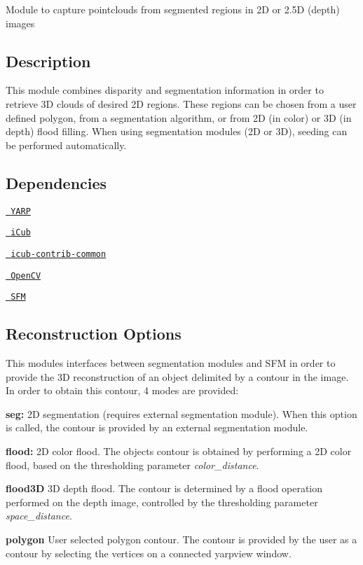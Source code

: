 Module to capture pointclouds from segmented regions in 2D or 2.\+5D (depth) images

\subsection*{Description}

This module combines disparity and segmentation information in order to retrieve 3D clouds of desired 2D regions. These regions can be chosen from a user defined polygon, from a segmentation algorithm, or from 2D (in color) or 3D (in depth) flood filling. When using segmentation modules (2D or 3D), seeding can be performed automatically.

\subsection*{Dependencies}


\begin{DoxyItemize}
\item \href{https://github.com/robotology/yarp}{\texttt{ Y\+A\+RP}}
\item \href{https://github.com/robotology/icub-main}{\texttt{ i\+Cub}}
\item \href{https://github.com/robotology/icub-contrib-common}{\texttt{ icub-\/contrib-\/common}}
\item \href{http://opencv.org/}{\texttt{ Open\+CV}}
\item \href{https://github.com/robotology/stereo-vision}{\texttt{ S\+FM}}
\end{DoxyItemize}

\subsection*{Reconstruction Options}

This modules interfaces between segmentation modules and S\+FM in order to provide the 3D reconstruction of an object delimited by a contour in the image. In order to obtain this contour, 4 modes are provided\+:


\begin{DoxyItemize}
\item {\bfseries{seg\+:}} 2D segmentation (requires external segmentation module). When this option is called, the contour is provided by an external segmentation module.
\item {\bfseries{flood\+:}} 2D color flood. The object\textquotesingle{}s contour is obtained by performing a 2D color flood, based on the thresholding parameter {\itshape color\+\_\+distance}.
\item {\bfseries{flood3D}} 3D depth flood. The contour is determined by a flood operation performed on the depth image, controlled by the thresholding parameter {\itshape space\+\_\+distance}.
\item {\bfseries{polygon}} User selected polygon contour. The contour is provided by the user as a contour by selecting the vertices on a connected yarpview window.
\end{DoxyItemize}

